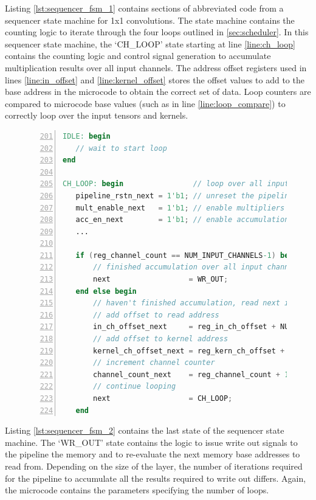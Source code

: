 \documentclass{uw-ece-wkrpt}
\begin{document}
Listing \ref{lst:sequencer_fsm_1} contains sections of abbreviated code from a sequencer state machine for 1x1 convolutions. The state machine contains the counting logic to iterate through the four loops outlined in \ref{sec:scheduler}. In this sequencer state machine, the `CH\_LOOP' state starting at line \ref{line:ch_loop} contains the counting logic and control signal generation to accumulate multiplication results over all input channels. The address offset registers used in lines \ref{line:in_offset} and \ref{line:kernel_offset} stores the offset values to add to the base address in the microcode to obtain the correct set of data. Loop counters are compared to microcode base values (such as in line \ref{line:loop_compare}) to correctly loop over the input \glspl{tensor} and \glspl{kernel}.

\begin{figure}
\centering
\begin{lstlisting}[caption={Sequencer state machine part 1}, label=lst:sequencer_fsm_1, language=Verilog, escapechar=|, numbers=left, firstnumber=201]
IDLE: begin
   // wait to start loop
end

CH_LOOP: begin                // loop over all input channels |\label{line:ch_loop}|
   pipeline_rstn_next = 1'b1; // unreset the pipeline
   mult_enable_next   = 1'b1; // enable multipliers
   acc_en_next        = 1'b1; // enable accumulation
   ...

   if (reg_channel_count == NUM_INPUT_CHANNELS-1) begin |\label{line:loop_compare}|
       // finished accumulation over all input channels, write out current tile
       next                  = WR_OUT;
   end else begin
       // haven't finished accumulation, read next input channel to accumulate
       // add offset to read address
       in_ch_offset_next     = reg_in_ch_offset + NUM_TILES; |\label{line:in_offset}|
       // add offset to kernel address
       kernel_ch_offset_next = reg_kern_ch_offset + 1; |\label{line:kernel_offset}|
       // increment channel counter
       channel_count_next    = reg_channel_count + 1;
       // continue looping
       next                  = CH_LOOP;
   end
\end{lstlisting}
\end{figure}

Listing \ref{lst:sequencer_fsm_2} contains the last state of the sequencer state machine. The `WR\_OUT' state contains the logic to issue write out signals to the pipeline the memory and to re-evaluate the next memory base addresses to read from. Depending on the size of the layer, the number of iterations required for the pipeline to accumulate all the results required to write out differs. Again, the microcode contains the parameters specifying the number of loops.
\end{document}
